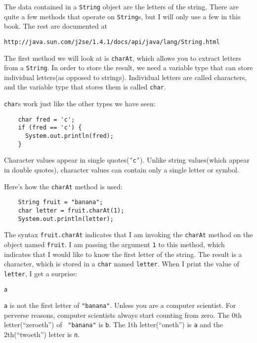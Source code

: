 \documentclass{book}
\begin{document}

The data contained in a {\tt String} object are the letters of the string.
There are quite a few methods that operate on {\tt String}s, but
I will only use a few in this book.  The rest are documented at

\begin{verbatim}
http://java.sun.com/j2se/1.4.1/docs/api/java/lang/String.html
\end{verbatim}
%
The first method we will look at is {\tt charAt}, which allows you
to extract letters from a {\tt String}.  In order to store the result, we
need a variable type that can store individual letters(as opposed
to strings).  Individual letters are called characters, and the
variable type that stores them is called {\tt char}.


{\tt char}s work just like the other types we have seen:

\begin{verbatim}
    char fred = 'c';
    if (fred == 'c') {
      System.out.println(fred);
    }
\end{verbatim}
%
Character values appear in single quotes({\tt 'c'}).  Unlike
string values(which appear in double quotes), character values
can contain only a single letter or symbol.


Here's how the {\tt charAt} method is used:

\begin{verbatim}
    String fruit = "banana";
    char letter = fruit.charAt(1);
    System.out.println(letter);
\end{verbatim}
%
The syntax {\tt fruit.charAt} indicates that I am 
invoking the {\tt charAt} method on the object named
{\tt fruit}.
I am passing the argument {\tt 1} to this method,
which indicates that I would like to know the first letter of
the string.  The result is a character, which is stored in a
{\tt char} named {\tt letter}.  When I print the value of
{\tt letter}, I get a surprise:

\begin{verbatim}
a
\end{verbatim}
%
{\tt a} is not the first letter of {\tt "banana"}.  Unless you are a
computer scientist.  For perverse reasons, computer scientists always
start counting from zero.  The 0th letter(``zeroeth'') of {\tt
"banana"} is {\tt b}.  The 1th letter(``oneth'') is {\tt a} and the
2th(``twoeth'') letter is {\tt n}.
\end{document}
